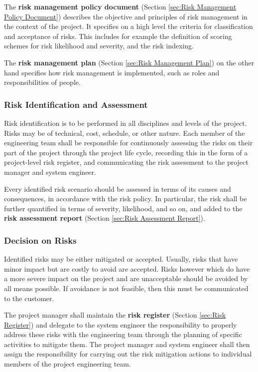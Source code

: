 The \textbf{risk management policy document} (Section \ref{sec:Risk Management Policy Document}) describes the objective and principles of risk management in the context of the project. It specifies on a high level the criteria for classification and acceptance of risks. This includes for example the definition of scoring schemes for risk likelihood and severity, and the risk indexing.

The \textbf{risk management plan} (Section \ref{sec:Risk Management Plan}) on the other hand specifies how risk management is implemented, such as roles and responsibilities of people.

\subsubsection{Risk Identification and Assessment}

Risk identification is to be performed in all disciplines and levels of the project. Risks may be of technical, cost, schedule, or other nature. Each member of the engineering team shall be responsible for continuously assessing the risks on their part of the project through the project life cycle, recording this in the form of a project-level risk register, and communicating the risk assessment to the project manager and system engineer.

Every identified risk scenario should be assessed in terms of its causes and consequences, in accordance with the risk policy. In particular, the risk shall be further quantified in terms of severity, likelihood, and so on, and added to the \textbf{risk assessment report} (Section \ref{sec:Risk Assessment Report}).

\subsubsection{Decision on Risks}
 
Identified risks may be either mitigated or accepted. Usually, risks that have minor impact but are costly to avoid are accepted. Risks however which do have a more severe impact on the project and are unacceptable should be avoided by all means possible. If avoidance is not feasible, then this must be communicated to the customer.

The project manager shall maintain the \textbf{risk register} (Section \ref{sec:Risk Register}) and delegate to the system engineer the responsibility to properly address these risks with the engineering team through the planning of specific activities to mitigate them. The project manager and system engineer shall then assign the responsibility for carrying out the risk mitigation actions to individual members of the project engineering team.
 
